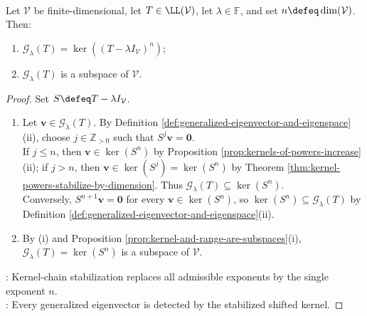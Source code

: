 \begin{theorem} \label{thm:generalized-eigenspace-stabilized-kernel} \\
Let $\mathcal{V}$ be finite-dimensional, let $T\in\LL(\mathcal{V})$, let $\lambda\in\mathbb{F}$, and set $n\defeq\dim(\mathcal{V})$. Then:
\begin{enumerate}[label=(\roman*)]
\setlength{\itemsep}{0pt}
\item $\mathcal{G}_{\lambda}(T)=\ker((T-\lambda I_{\mathcal{V}})^n)$;
\item $\mathcal{G}_{\lambda}(T)$ is a subspace of $\mathcal{V}$.
\end{enumerate}
\begin{proof}
Set $S\defeq T-\lambda I_{\mathcal{V}}$.
\begin{enumerate}[label=(\roman*)]
\setlength{\itemsep}{0pt}
\item Let $\mathbf{v}\in\mathcal{G}_{\lambda}(T)$. By Definition \ref{def:generalized-eigenvector-and-eigenspace}(ii), choose $j\in\mathbb{Z}_{>0}$ such that $S^j\mathbf{v}=\mathbf{0}$.\\
If $j\leq n$, then $\mathbf{v}\in\ker(S^n)$ by Proposition \ref{prop:kernels-of-powers-increase}(ii); if $j>n$, then $\mathbf{v}\in\ker(S^j)=\ker(S^n)$ by Theorem \ref{thm:kernel-powers-stabilize-by-dimension}. Thus $\mathcal{G}_{\lambda}(T)\subseteq\ker(S^n)$.\\
Conversely, $S^{n+1}\mathbf{v}=\mathbf{0}$ for every $\mathbf{v}\in\ker(S^n)$, so $\ker(S^n)\subseteq\mathcal{G}_{\lambda}(T)$ by Definition \ref{def:generalized-eigenvector-and-eigenspace}(ii).
\item By (i) and Proposition \ref{prop:kernel-and-range-are-subspaces}(i), $\mathcal{G}_{\lambda}(T)=\ker(S^n)$ is a subspace of $\mathcal{V}$.
\end{enumerate}
: Kernel-chain stabilization replaces all admissible exponents by the single exponent $n$.\\
: Every generalized eigenvector is detected by the stabilized shifted kernel.
\end{proof}
\end{theorem}

